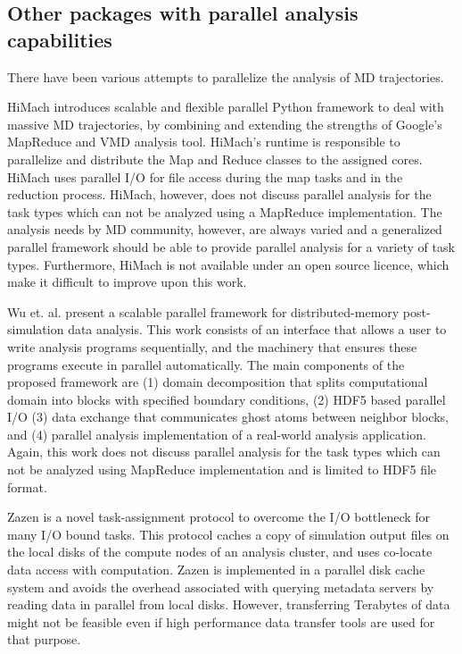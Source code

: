\label{background}

\subsection{Other packages with parallel analysis capabilities}
\label{sec:otherparallel}

There have been various attempts to parallelize the analysis of MD trajectories. 

HiMach \cite{himach-2008} introduces scalable and flexible parallel Python framework to deal with massive MD trajectories, by combining and extending the strengths of Google's MapReduce and VMD analysis tool. 
HiMach's runtime is responsible to parallelize and distribute the Map and Reduce classes to the assigned cores.
HiMach uses parallel I/O for file access during the map tasks and  in the reduction process. 
HiMach, however, does not discuss parallel analysis for the task types which can not be analyzed using a MapReduce implementation.
The analysis needs by MD community, however, are always varied and a generalized parallel framework should be able to provide parallel analysis for a variety of task types.
Furthermore, HiMach is not available under an open source licence, which make it difficult to improve upon this work.

Wu et. al. \cite{Wu_et.al} present a scalable parallel framework for distributed-memory post-simulation data analysis.
This work consists of an interface that allows a user to write analysis programs sequentially, and the machinery that ensures these programs execute in parallel automatically. 
The main components of the proposed framework are (1) domain decomposition that splits computational domain into blocks with specified boundary conditions, (2) HDF5 based parallel I/O (3) data exchange that communicates ghost atoms between neighbor blocks, and (4) parallel analysis implementation of a real-world analysis application.
Again, this work does not discuss parallel analysis for the task types which can not be analyzed using MapReduce implementation and is limited to HDF5 file format.

Zazen \cite{Zazen} is a novel task-assignment protocol to overcome the I/O bottleneck for many I/O bound tasks. This protocol caches a copy of simulation output files on the local disks of the compute nodes of an analysis cluster, and uses co-locate data access with computation. 
Zazen is implemented in a parallel disk cache system and avoids the overhead associated with querying metadata servers by reading data in parallel from local disks.
However, transferring Terabytes of data might not be feasible even if high performance data transfer tools are used for that purpose.


